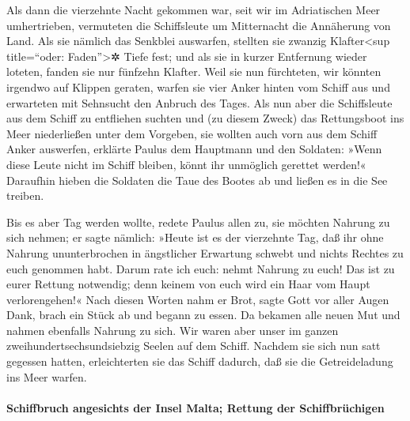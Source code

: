  Als dann die vierzehnte Nacht gekommen war, seit wir im
Adriatischen Meer umhertrieben, vermuteten die Schiffsleute um
Mitternacht die Annäherung von Land.  Als sie nämlich das
Senkblei auswarfen, stellten sie zwanzig Klafter\textless sup
title=``oder: Faden''\textgreater✲ Tiefe fest; und als sie in kurzer
Entfernung wieder loteten, fanden sie nur fünfzehn Klafter.
 Weil sie nun fürchteten, wir könnten irgendwo auf
Klippen geraten, warfen sie vier Anker hinten vom Schiff aus und
erwarteten mit Sehnsucht den Anbruch des Tages.  Als nun
aber die Schiffsleute aus dem Schiff zu entfliehen suchten und (zu
diesem Zweck) das Rettungsboot ins Meer niederließen unter dem Vorgeben,
sie wollten auch vorn aus dem Schiff Anker auswerfen, 
erklärte Paulus dem Hauptmann und den Soldaten: »Wenn diese Leute nicht
im Schiff bleiben, könnt ihr unmöglich gerettet werden!« 
Daraufhin hieben die Soldaten die Taue des Bootes ab und ließen es in
die See treiben.

 Bis es aber Tag werden wollte, redete Paulus allen zu,
sie möchten Nahrung zu sich nehmen; er sagte nämlich: »Heute ist es der
vierzehnte Tag, daß ihr ohne Nahrung ununterbrochen in ängstlicher
Erwartung schwebt und nichts Rechtes zu euch genommen habt.
 Darum rate ich euch: nehmt Nahrung zu euch! Das ist zu
eurer Rettung notwendig; denn keinem von euch wird ein Haar vom Haupt
verlorengehen!«  Nach diesen Worten nahm er Brot, sagte
Gott vor aller Augen Dank, brach ein Stück ab und begann zu essen.
 Da bekamen alle neuen Mut und nahmen ebenfalls Nahrung
zu sich.  Wir waren aber unser im ganzen
zweihundertsechsundsiebzig Seelen auf dem Schiff. 
Nachdem sie sich nun satt gegessen hatten, erleichterten sie das Schiff
dadurch, daß sie die Getreideladung ins Meer warfen.

\hypertarget{schiffbruch-angesichts-der-insel-malta-rettung-der-schiffbruxfcchigen}{%
\paragraph{Schiffbruch angesichts der Insel Malta; Rettung der
Schiffbrüchigen}\label{schiffbruch-angesichts-der-insel-malta-rettung-der-schiffbruxfcchigen}}

